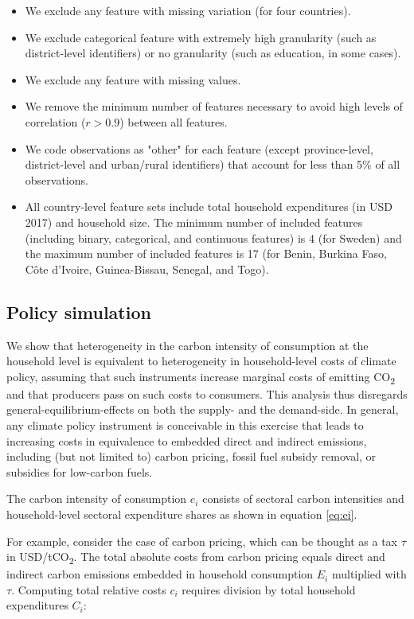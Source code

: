 \documentclass[12pt, a4paper]{article}
\begin{document}
\begin{refsection}
\begin{itemize}
    \item We exclude any feature with missing variation (for four countries).
    \item We exclude categorical feature with extremely high granularity (such as district-level identifiers) or no granularity (such as education, in some cases).
    \item We exclude any feature with missing values.
    \item We remove the minimum number of features necessary to avoid high levels of correlation ($r>0.9$) between all features.
    \item We code observations as "other" for each feature (except province-level, district-level and urban/rural identifiers) that account for less than 5\% of all observations.
    \item All country-level feature sets include total household expenditures (in USD 2017) and household size. The minimum number of included features (including binary, categorical, and continuous features) is 4 (for Sweden) and the maximum number of included features is 17 (for Benin, Burkina Faso, Côte d'Ivoire, Guinea-Bissau, Senegal, and Togo).
\end{itemize}

\subsection{Policy simulation}\label{sec:policysimulation}

We show that heterogeneity in the carbon intensity of consumption at the household level is equivalent to heterogeneity in household-level costs of climate policy, assuming that such instruments increase marginal costs of emitting CO\textsubscript{2} and that producers pass on such costs to consumers. This analysis thus disregards general-equilibrium-effects on both the supply- and the demand-side. In general, any climate policy instrument is conceivable in this exercise that leads to increasing costs in equivalence to embedded direct and indirect emissions, including (but not limited to) carbon pricing, fossil fuel subsidy removal, or subsidies for low-carbon fuels.

The carbon intensity of consumption $e_{i}$ consists of sectoral carbon intensities and household-level sectoral expenditure shares as shown in equation \ref{eq:ei}. 

For example, consider the case of carbon pricing, which can be thought as a tax $\tau$ in USD/tCO\textsubscript{2}. The total absolute costs from carbon pricing equals direct and indirect carbon emissions embedded in household consumption $E_{i}$ multiplied with $\tau$. Computing total relative costs $c_{i}$ requires division by total household expenditures $C_{i}$:


\end{refsection}
\end{document}
